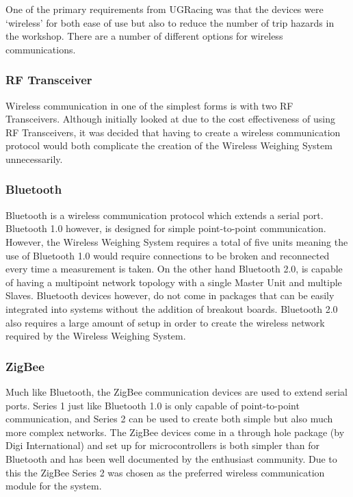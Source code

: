 One of the primary requirements from UGRacing was that the devices were `wireless' for both ease of use but also to reduce the number of trip hazards in the workshop. There are a number of different options for wireless communications.
\subsubsection{RF Transceiver}
Wireless communication in one of the simplest forms is with two RF Transceivers. Although initially looked at due to the cost effectiveness of using RF Transceivers, it was decided that having to create a wireless communication protocol would both complicate the creation of the Wireless Weighing System unnecessarily.
\subsubsection{Bluetooth}
Bluetooth is a wireless communication protocol which extends a serial port. Bluetooth 1.0 however, is designed for simple point-to-point communication. However, the Wireless Weighing System requires a total of five units meaning the use of Bluetooth 1.0 would require connections to be broken and reconnected every time a measurement is taken. On the other hand Bluetooth 2.0, is capable of having a multipoint network topology with a single Master Unit and multiple Slaves. Bluetooth devices however, do not come in packages that can be easily integrated into systems without the addition of breakout boards. Bluetooth 2.0 also requires a large amount of setup in order to create the wireless network required by the Wireless Weighing System.
\subsubsection{ZigBee}
Much like Bluetooth, the ZigBee communication devices are used to extend serial ports. Series 1 just like Bluetooth 1.0 is only capable of point-to-point communication, and Series 2 can be used to create both simple but also much more complex networks. The ZigBee devices come in a through hole package (by Digi International) and set up for microcontrollers is both simpler than for Bluetooth and has been well documented by the enthusiast community. Due to this the ZigBee Series 2 was chosen as the preferred wireless communication module for the system.
